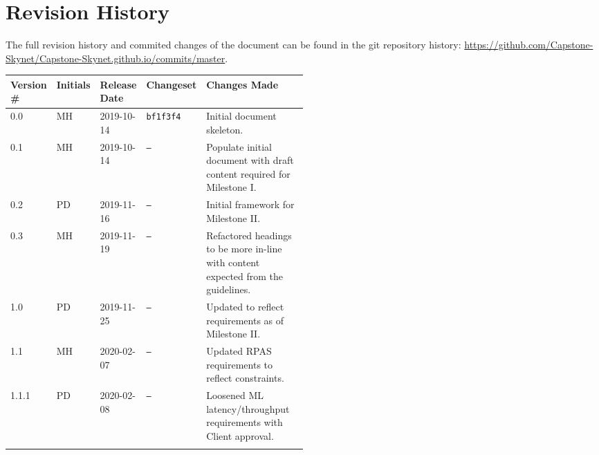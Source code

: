 \thispagestyle{empty}
\section*{Revision History}
The full revision history and commited changes of the document can be found in the git repository history: \href{https://github.com/Capstone-Skynet/Capstone-Skynet.github.io}{https://github.com/Capstone-Skynet/Capstone-Skynet.github.io/commits/master}.

\begin{table}[H]
\begin{tabular}{*{4}{l}p{0.5\linewidth}}
\hline
Version \# & Initials & Release Date & Changeset & Changes Made \\ \hline

0.0 & MH & 2019-10-14 & \texttt{bf1f3f4} & Initial document skeleton.\\
0.1 & MH & 2019-10-14 & \texttt{--} & Populate initial document with draft content required for Milestone I.\\
0.2 & PD & 2019-11-16 & \texttt{--} & Initial framework for Milestone II.\\
0.3 & MH & 2019-11-19 & \texttt{--} & Refactored headings to be more in-line with content expected from the guidelines.\\
1.0 & PD & 2019-11-25 & \texttt{--} & Updated to reflect requirements as of Milestone II.\\
1.1 & MH & 2020-02-07 & \texttt{--} & Updated RPAS requirements to reflect constraints.\\
1.1.1 & PD & 2020-02-08 & \texttt{--} & Loosened ML latency/throughput requirements with Client approval.\\

 & & & \\ \hline
\end{tabular}
\end{table}